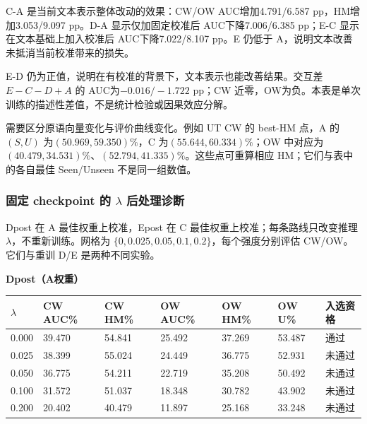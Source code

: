 \documentclass[12pt,a4paper,UTF8]{ctexart}
\newenvironment{reporttable}{\par\smallskip\begingroup\small\centering}{\par\endgroup\smallskip}
\begin{document}
C-A 是当前文本表示整体改动的效果：CW/OW AUC增加4.791/6.587 pp，HM增加3.053/9.097 pp。D-A 显示仅加固定校准后 AUC下降7.006/6.385 pp；E-C 显示在文本基础上加入校准后 AUC下降7.022/8.107 pp。E 仍低于 A，说明文本改善未抵消当前校准带来的损失。

E-D 仍为正值，说明在有校准的背景下，文本表示也能改善结果。交互差 $E-C-D+A$ 的 AUC为$-0.016/-1.722$ pp；CW 近零，OW为负。本表是单次训练的描述性差值，不是统计检验或因果效应分解。

需要区分原语向量变化与评价曲线变化。例如 UT CW 的 best-HM 点，A 的 $(S,U)$ 为$(50.969,59.350)\%$，C 为$(55.644,60.334)\%$；OW 中对应为$(40.479,34.531)\%$、$(52.794,41.335)\%$。这些点可重算相应 HM；它们与表中的各自最佳 Seen/Unseen 不是同一组数值。
\subsubsection{固定 checkpoint 的 $\lambda$ 后处理诊断}
Dpost 在 A 最佳权重上校准，Epost 在 C 最佳权重上校准；每条路线只改变推理 $\lambda$，不重新训练。网格为 $\{0,0.025,0.05,0.1,0.2\}$，每个强度分别评估 CW/OW。它们与重训 D/E 是两种不同实验。

\noindent\textbf{Dpost（A权重）}

\begin{reporttable}

\footnotesize

\begin{tabularx}{\linewidth}{|Z|Z|Z|Z|Z|Z|Z|}
\hline

\textbf{$\lambda$} & \textbf{CW AUC\%} & \textbf{CW HM\%} & \textbf{OW AUC\%} & \textbf{OW HM\%} & \textbf{OW U\%} & \textbf{入选资格} \\ \hline

0.000 & 39.470 & 54.841 & 25.492 & 37.269 & 53.487 & 通过 \\ \hline

0.025 & 38.399 & 55.024 & 24.449 & 36.775 & 52.931 & 未通过 \\ \hline

0.050 & 36.775 & 54.211 & 22.719 & 35.208 & 50.492 & 未通过 \\ \hline

0.100 & 31.572 & 51.037 & 18.348 & 30.782 & 43.902 & 未通过 \\ \hline

0.200 & 20.402 & 40.479 & 11.897 & 25.168 & 33.248 & 未通过 \\ \hline

\end{tabularx}\end{reporttable}
\end{document}
